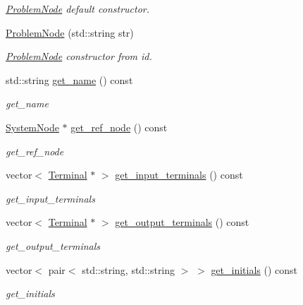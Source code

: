 \begin{DoxyCompactItemize}
\begin{DoxyCompactList}\small\item\em \hyperlink{class_problem_node}{Problem\+Node} default constructor. \end{DoxyCompactList}\item 
\hyperlink{class_problem_node_a44f4d955cf9e6511a8c1167d267b4b1f}{Problem\+Node} (std\+::string str)
\begin{DoxyCompactList}\small\item\em \hyperlink{class_problem_node}{Problem\+Node} constructor from id. \end{DoxyCompactList}\item 
std\+::string \hyperlink{class_problem_node_a3ed292114a64c22a73f22af4cef39cbe}{get\+\_\+name} () const 
\begin{DoxyCompactList}\small\item\em get\+\_\+name \end{DoxyCompactList}\item 
\hyperlink{class_system_node}{System\+Node} $\ast$ \hyperlink{class_problem_node_a9c95d7a2f4d9bdcf9219541bf5513149}{get\+\_\+ref\+\_\+node} () const 
\begin{DoxyCompactList}\small\item\em get\+\_\+ref\+\_\+node \end{DoxyCompactList}\item 
vector$<$ \hyperlink{class_terminal}{Terminal} $\ast$ $>$ \hyperlink{class_problem_node_af2ae217f6705303eaaaffb7c52d43a64}{get\+\_\+input\+\_\+terminals} () const 
\begin{DoxyCompactList}\small\item\em get\+\_\+input\+\_\+terminals \end{DoxyCompactList}\item 
vector$<$ \hyperlink{class_terminal}{Terminal} $\ast$ $>$ \hyperlink{class_problem_node_af500b2ee484e05950319793a6dfaf150}{get\+\_\+output\+\_\+terminals} () const 
\begin{DoxyCompactList}\small\item\em get\+\_\+output\+\_\+terminals \end{DoxyCompactList}\item 
vector$<$ pair$<$ std\+::string, std\+::string $>$ $>$ \hyperlink{class_problem_node_a6296775d75919e4fa3812c0ccc819378}{get\+\_\+initials} () const 
\begin{DoxyCompactList}\small\item\em get\+\_\+initials \end{DoxyCompactList}\item 

\end{DoxyCompactItemize}
